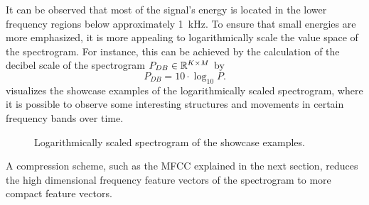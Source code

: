 \FloatBarrier
\noindent
It can be observed that most of the signal's energy is located in the lower frequency regions below approximately \SI{1}{\kilo\hertz}.
To ensure that small energies are more emphasized, it is more appealing to logarithmically scale the value space of the spectrogram.
For instance, this can be achieved by the calculation of the decibel scale of the spectrogram $P_{DB} \in \mathbb{R}^{K \times M}$ by
\begin{equation}\label{eq:signal_spec_log}
  P_{DB} = 10 \cdot \log_{10}{P}.
\end{equation}
 visualizes the showcase examples of the logarithmically scaled spectrogram, where it is possible to observe some interesting structures and movements in certain frequency bands over time.
\begin{figure}[!ht]
  \centering
    \quad
    \quad
  \caption{Logarithmically scaled spectrogram of the showcase examples.}
  \label{fig:signal_spec_log_showcase}
\end{figure}
\FloatBarrier
\noindent
A compression scheme, such as the MFCC explained in the next section, reduces the high dimensional frequency feature vectors of the spectrogram to more compact feature vectors.